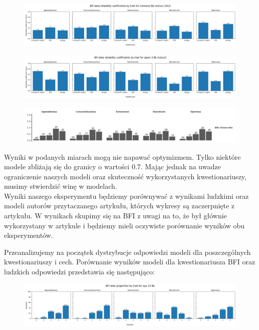\documentclass{article}
\begin{document}
\begin{figure}[H]
    \centering
    \includegraphics[width=0.7 \linewidth]{../Prompt_code/plots/ministral-8b-instruct-2410/bfi_reliability.png}
\end{figure}

\begin{figure}[H]
    \centering
    \includegraphics[width=0.7 \linewidth]{../Prompt_code/plots/qwen-3-8b-instruct/bfi_reliability.png}
\end{figure}

\begin{figure}[H]
    \centering
    \includegraphics[width=0.7 \linewidth]{./article_data/human_distr.png}
\end{figure}

Wyniki w podanych miarach mogą nie napawać optymizmem. Tylko niektóre modele zbliżają się do granicy o wartości 0.7. Mając jednak na uwadze ograniczenie naszych modeli oraz skuteczność wykorzystanych kwestionariuszy, musimy stwierdzić winę w modelach. \\


Wyniki naszego eksperymentu będziemy porównywać z wynikami ludzkimi oraz modeli autorów przytaczanego artykułu, których wykresy są zaczerpnięte z artykułu. 
W wynikach skupimy się na BFI z uwagi na to, że był głównie wykorzystany w artykule i będziemy mieli oczywiste porównanie wyników obu eksperymentów.

Przeanalizujemy na początek dystrybucje odpowiedzi modeli dla poszczególnych kwestionariuszy i cech. Porównanie wyników modeli dla kwestionariusza BFI oraz ludzkich odpowiedzi przedstawia się następująco:

\begin{figure}[H]
    \centering
    \includegraphics[width=0.7 \linewidth]{../Prompt_code/plots/aya-23-8b/bfi_distribution.png}
\end{figure}
\end{document}
